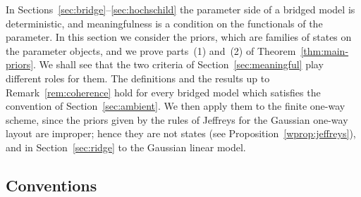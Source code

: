 \documentclass[11pt,a4paper]{article}
\theoremstyle{plain}
\theoremstyle{definition}
\theoremstyle{remark}
\begin{document}
In Sections~\ref{sec:bridge}--\ref{sec:hochschild} the parameter side of a
bridged model is deterministic, and meaningfulness is a condition on the
functionals of the parameter. In this section we consider the priors, which are
families of states on the parameter objects, and we prove parts~(1) and~(2) of
Theorem~\ref{thm:main-priors}. We shall see that the two criteria of
Section~\ref{sec:meaningful} play different roles for them. The definitions
and the results up to Remark~\ref{rem:coherence} hold for every bridged model
which satisfies the convention of Section~\ref{sec:ambient}. We then apply
them to the finite one-way scheme, since the priors given by the rules of
Jeffreys for the Gaussian one-way layout are improper; hence they are not
states (see Proposition~\ref{wprop:jeffreys}), and in Section~\ref{sec:ridge}
to the Gaussian linear model.

\subsection{Conventions}
\end{document}
